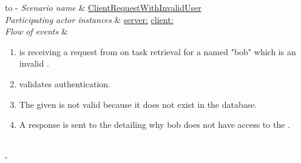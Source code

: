 %
%
\begin{table}[h!]
	\tabulinesep=1.5mm
	\begin{tabu} to 
		\tabucline[1.5pt]-
		\textit{Scenario name} & \underline{ClientRequestWithInvalidUser} \\
		\hline
		\textit{Participating actor \newline instances} & \underline{server:\serverside}
		\newline \underline{client:\clientside} \\
		\hline
		\textit{Flow of events} &
		\vspace{-3mm}
		\begin{enumerate}[leftmargin=*,topsep=0pt,itemsep=-1ex]
			\item \serverside is receiving a request from \clientside on task retrieval for a \user named "bob" which is an invalid \user.
			
			\item \serverside validates \user authentication. 
			
			\item The given \user is not valid because it does not exist in the database.
			
			\item A response is sent to the \clientside detailing why bob does not have access to the \system. \\                
		\end{enumerate} \\
		\tabucline[1.5pt]-
	\end{tabu}
	\caption{Scenario when a invalid user is trying to get access to the server.}
	\label{sc:ClientRequestWithInvalidUser}
\end{table}